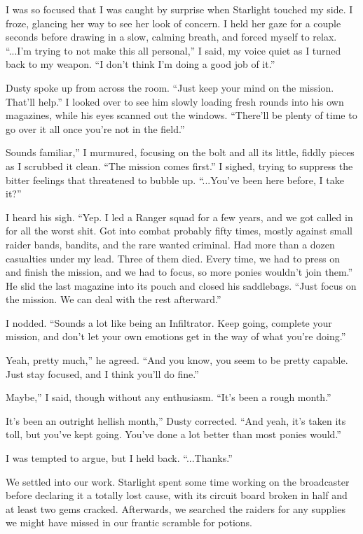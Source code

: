 I was so focused that I was caught by surprise when Starlight touched my side. I froze, glancing her way to see her look of concern. I held her gaze for a couple seconds before drawing in a slow, calming breath, and forced myself to relax. “...I’m trying to not make this all personal,” I said, my voice quiet as I turned back to my weapon. “I don’t think I’m doing a good job of it.”

Dusty spoke up from across the room. “Just keep your mind on the mission. That'll help.” I looked over to see him slowly loading fresh rounds into his own magazines, while his eyes scanned out the windows. “There’ll be plenty of time to go over it all once you’re not in the field.”

\leavevmode{}Sounds familiar,” I murmured, focusing on the bolt and all its little, fiddly pieces as I scrubbed it clean. “The mission comes first.” I sighed, trying to suppress the bitter feelings that threatened to bubble up. “...You’ve been here before, I take it?”

I heard his sigh. “Yep. I led a Ranger squad for a few years, and we got called in for all the worst shit. Got into combat probably fifty times, mostly against small raider bands, bandits, and the rare wanted criminal. Had more than a dozen casualties under my lead. Three of them died. Every time, we had to press on and finish the mission, and we had to focus, so more ponies wouldn’t join them.” He slid the last magazine into its pouch and closed his saddlebags. “Just focus on the mission. We can deal with the rest afterward.”

I nodded. “Sounds a lot like being an Infiltrator. Keep going, complete your mission, and don’t let your own emotions get in the way of what you’re doing.”

\leavevmode{}Yeah, pretty much,” he agreed. “And you know, you seem to be pretty capable. Just stay focused, and I think you’ll do fine.”

\leavevmode{}Maybe,” I said, though without any enthusiasm. “It’s been a rough month.”

\leavevmode{}It’s been an outright hellish month,” Dusty corrected. “And yeah, it’s taken its toll, but you’ve kept going. You’ve done a lot better than most ponies would.”

I was tempted to argue, but I held back. “...Thanks.”

We settled into our work. Starlight spent some time working on the broadcaster before declaring it a totally lost cause, with its circuit board broken in half and at least two gems cracked. Afterwards, we searched the raiders for any supplies we might have missed in our frantic scramble for potions.

